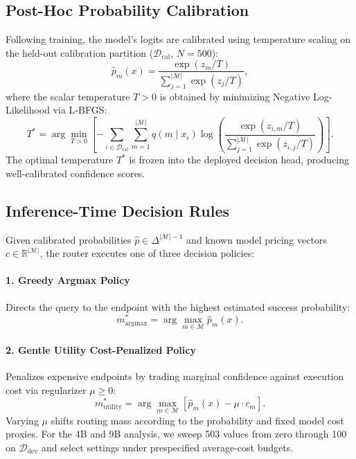\documentclass[11pt,a4paper]{article}
\begin{document}
\subsection{Post-Hoc Probability Calibration}
\label{subsec:calibration_method}

Following training, the model's logits are calibrated using temperature scaling on the held-out calibration partition ($\mathcal{D}_{\text{cal}}$, $N = 500$):
\begin{equation}
\hat{p}_m(x) = \frac{\exp(z_m / T)}{\sum_{j=1}^{|\mathcal{M}|} \exp(z_j / T)},
\end{equation}
where the scalar temperature $T > 0$ is obtained by minimizing Negative Log-Likelihood via L-BFGS:
\begin{equation}
T^* = \arg\min_{T > 0} \left[ - \sum_{i \in \mathcal{D}_{\text{cal}}} \sum_{m=1}^{|\mathcal{M}|} q(m \mid x_i) \log \left( \frac{\exp(z_{i,m} / T)}{\sum_{j=1}^{|\mathcal{M}|} \exp(z_{i,j} / T)} \right) \right].
\end{equation}
The optimal temperature $T^*$ is frozen into the deployed decision head, producing well-calibrated confidence scores.

\subsection{Inference-Time Decision Rules}
\label{subsec:decision_rules}

Given calibrated probabilities $\hat{p} \in \Delta^{|\mathcal{M}|-1}$ and known model pricing vectors $c \in \mathbb{R}^{|\mathcal{M}|}$, the router executes one of three decision policies:

\paragraph{1. Greedy Argmax Policy}
Directs the query to the endpoint with the highest estimated success probability:
\begin{equation}
m^*_{\text{argmax}} = \arg\max_{m \in \mathcal{M}} \hat{p}_m(x).
\end{equation}

\paragraph{2. Gentle Utility Cost-Penalized Policy}
Penalizes expensive endpoints by trading marginal confidence against execution cost via regularizer $\mu \ge 0$:
\begin{equation}
m^*_{\text{utility}} = \arg\max_{m \in \mathcal{M}} \left[ \hat{p}_m(x) - \mu \cdot c_m \right].
\end{equation}
Varying $\mu$ shifts routing mass according to the probability and fixed model cost proxies. For the 4B and 9B analysis, we sweep 503 values from zero through 100 on $\mathcal{D}_{\text{dev}}$ and select settings under prespecified average-cost budgets.
\end{document}
